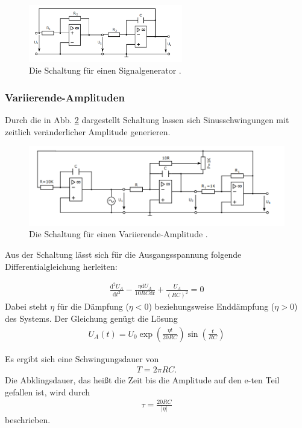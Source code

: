     \begin{figure}
    \centering
    \includegraphics[width=0.6\textwidth]{Pics/generator.png}
    \caption{Die Schaltung für einen Signalgenerator \cite{anleitungneu}.}
    \label{fig:generator}
    \end{figure}

    \subsubsection{Variierende-Amplituden}

    Durch die in Abb. \ref{fig:varamp} dargestellt Schaltung lassen sich Sinusschwingungen mit zeitlich veränderlicher Amplitude generieren.

    \begin{figure}
    \centering
    \includegraphics[width=1.2\textwidth]{Pics/varamp.png}
    \caption{Die Schaltung für einen Variierende-Amplitude \cite{anleitungneu}.}
    \label{fig:varamp}
    \end{figure}

    Aus der Schaltung lässt sich für die Ausgangsspannung folgende Differentialgleichung herleiten:
    
    \begin{align}
        \frac{\mathrm{d^2}U_A}{\mathrm{d}t^2} - \frac{\eta\mathrm{d}U_A}{10RC\mathrm{d}t} + \frac{U_A}{(RC)^2} = 0
    \end{align}
    Dabei steht $\eta$ für die Dämpfung ($\eta<0$) beziehungsweise Enddämpfung ($\eta>0$) des Systems.
    Der Gleichung genügt die Lösung
    \begin{align}
        U_A(t) = U_0\exp(\frac{\eta t}{20RC})\sin(\frac{t}{RC})
    \end{align}

    Es ergibt sich eine Schwingungsdauer von
    \begin{align}
        T = 2\pi RC.
    \end{align}
    Die Abklingsdauer, das heißt die Zeit bis die Amplitude auf den e-ten Teil gefallen ist, wird durch
    \begin{align}
        \tau = \frac{20RC}{|\eta|}
    \end{align}
    beschrieben.